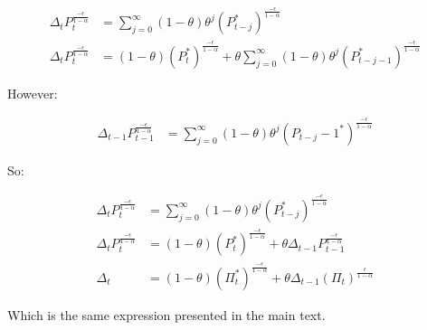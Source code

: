 \documentclass[11pt]{article}
\begin{document}
\begin{align*}
\Delta_t P_t^{\frac{-\epsilon}{1-\alpha}}&=\sum_{j=0}^{\infty}(1-\theta)\theta^j(P_{t-j}^*)^{\frac{-\epsilon}{1-\alpha}}\\
\Delta_t P_t^{\frac{-\epsilon}{1-\alpha}}&=(1-\theta)(P_t^*)^{\frac{-\epsilon}{1-\alpha}}+\theta\sum_{j=0}^{\infty}(1-\theta)\theta^j(P_{t-j-1}^*)^{\frac{-\epsilon}{1-\alpha}}
\end{align*}

However:

\begin{align*}
\Delta_{t-1} P_{t-1}^{\frac{-\epsilon}{1-\alpha}}&=\sum_{j=0}^{\infty}(1-\theta)\theta^j(P_{t-j}-1^*)^{\frac{-\epsilon}{1-\alpha}}
\end{align*}

So:

\begin{align*}
\Delta_t P_t^{\frac{-\epsilon}{1-\alpha}}&=\sum_{j=0}^{\infty}(1-\theta)\theta^j(P_{t-j}^*)^{\frac{-\epsilon}{1-\alpha}}\\
\Delta_t P_t^{\frac{-\epsilon}{1-\alpha}}&=(1-\theta)(P_t^*)^{\frac{-\epsilon}{1-\alpha}}+\theta\Delta_{t-1} P_{t-1}^{\frac{-\epsilon}{1-\alpha}}\\
\Delta_t&=(1-\theta)(\Pi_t^*)^{\frac{-\epsilon}{1-\alpha}}+\theta\Delta_{t-1}(\Pi_{t})^{\frac{\epsilon}{1-\alpha}}
\end{align*}

Which is the same expression presented in the main text.

	
\end{document}
